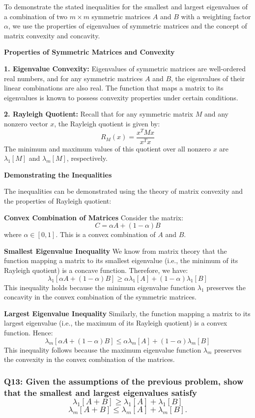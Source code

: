 \documentclass[8pt]{article}
\begin{document}
{{To demonstrate the stated inequalities for the smallest and largest eigenvalues of a combination of two \(m \times m\) symmetric matrices \(A\) and \(B\) with a weighting factor \(\alpha\), we use the properties of eigenvalues of symmetric matrices and the concept of matrix convexity and concavity.

\textbf{Properties of Symmetric Matrices and Convexity}

\textbf{1. Eigenvalue Convexity:}
   Eigenvalues of symmetric matrices are well-ordered real numbers, and for any symmetric matrices \(A\) and \(B\), the eigenvalues of their linear combinations are also real. The function that maps a matrix to its eigenvalues is known to possess convexity properties under certain conditions.

\textbf{2. Rayleigh Quotient:}
   Recall that for any symmetric matrix \(M\) and any nonzero vector \(x\), the Rayleigh quotient is given by:
   \[
   R_M(x) = \frac{x^T M x}{x^T x}
   \]
   The minimum and maximum values of this quotient over all nonzero \(x\) are \(\lambda_1[M]\) and \(\lambda_m[M]\), respectively.

\textbf{Demonstrating the Inequalities}

The inequalities can be demonstrated using the theory of matrix convexity and the properties of Rayleigh quotient:

\textbf{Convex Combination of Matrices}
Consider the matrix:
\[
C = \alpha A + (1 - \alpha) B
\]
where \(\alpha \in [0, 1]\). This is a convex combination of \(A\) and \(B\).

\textbf{Smallest Eigenvalue Inequality}
We know from matrix theory that the function mapping a matrix to its smallest eigenvalue (i.e., the minimum of its Rayleigh quotient) is a concave function. Therefore, we have:
\[
\lambda_1[\alpha A + (1 - \alpha) B] \geq \alpha \lambda_1[A] + (1 - \alpha) \lambda_1[B]
\]
This inequality holds because the minimum eigenvalue function \(\lambda_1\) preserves the concavity in the convex combination of the symmetric matrices.

\textbf{Largest Eigenvalue Inequality}
Similarly, the function mapping a matrix to its largest eigenvalue (i.e., the maximum of its Rayleigh quotient) is a convex function. Hence:
\[
\lambda_m[\alpha A + (1 - \alpha) B] \leq \alpha \lambda_m[A] + (1 - \alpha) \lambda_m[B]
\]
This inequality follows because the maximum eigenvalue function \(\lambda_m\) preserves the convexity in the convex combination of the matrices.

\subsubsection*{Q13: Given the assumptions of the previous problem, show that the smallest and largest eigenvalues satisfy
\[
\lambda_1[A + B] \geq \lambda_1[A] + \lambda_1[B]
\]
\[
\lambda_m[A + B] \leq \lambda_m[A] + \lambda_m[B].
\]
}

}}
\end{document}
